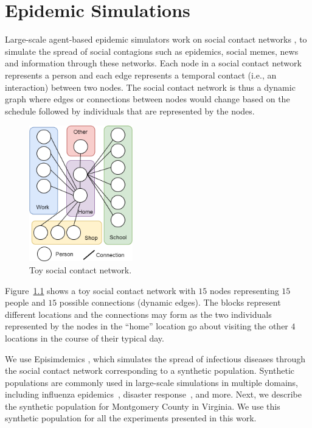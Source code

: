 \documentclass[doublespace]{VTthesis}
\begin{document}
	\chapter{Epidemic Simulations} \label{ch:epi-simulations}
	Large-scale agent-based epidemic simulators work on social contact networks \cite{Glass2008}, to simulate the spread of social contagions such as epidemics, social memes, news and information through these networks. Each node in a social contact network represents a person and each edge represents a temporal contact (i.e., an interaction) between two nodes. The social contact network is thus a dynamic graph where edges or connections between nodes would change based on the schedule followed by individuals that are represented by the nodes. 
	\begin{figure}
    \centering
    \includegraphics[width=0.4\textwidth]{figures/scn.png}
    \caption{Toy social contact network.}
    \label{fig:scn}
    \end{figure}
	Figure~\ref{fig:scn} shows a toy social contact network with $15$ nodes representing $15$ people and $15$ possible connections (dynamic edges). The blocks represent different locations and the connections may form as the two individuals represented by the nodes in the ``home'' location go about visiting the other $4$ locations in the course of their typical day.
	
	We use Episimdemics \cite{barrett2008episimdemics}, which simulates the spread of infectious diseases through the social contact network corresponding to a synthetic population. Synthetic populations are commonly used in large-scale simulations in multiple domains, including influenza epidemics~\cite{EG+04,parikh14cover}, disaster response~\cite{parikh13nps1}, and more. Next, we describe the synthetic population for Montgomery County in Virginia. We use this synthetic population for all the experiments presented in this work.  
    
\end{document}
